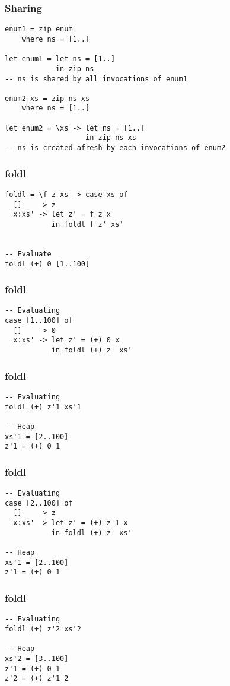 \documentclass{beamer}
\begin{document}
\begin{frame}[t,fragile]
\frametitle{Sharing}
\begin{verbatim}
enum1 = zip enum
    where ns = [1..]

let enum1 = let ns = [1..]
            in zip ns
-- ns is shared by all invocations of enum1

enum2 xs = zip ns xs
    where ns = [1..]

let enum2 = \xs -> let ns = [1..]
                   in zip ns xs
-- ns is created afresh by each invocations of enum2
\end{verbatim}
\end{frame}

\begin{frame}[fragile]
\frametitle{foldl}
\begin{verbatim}
foldl = \f z xs -> case xs of
  []    -> z
  x:xs' -> let z' = f z x
           in foldl f z' xs'


-- Evaluate
foldl (+) 0 [1..100]           
\end{verbatim}
\end{frame}

\begin{frame}[t,fragile]
\frametitle{foldl}
\begin{verbatim}
-- Evaluating
case [1..100] of
  []    -> 0
  x:xs' -> let z' = (+) 0 x
           in foldl (+) z' xs'
\end{verbatim}
\end{frame}

\begin{frame}[t,fragile]
\frametitle{foldl}
\begin{verbatim}
-- Evaluating
foldl (+) z'1 xs'1

-- Heap
xs'1 = [2..100]
z'1 = (+) 0 1
\end{verbatim}
\end{frame}

\begin{frame}[t,fragile]
\frametitle{foldl}
\begin{verbatim}
-- Evaluating
case [2..100] of
  []    -> z
  x:xs' -> let z' = (+) z'1 x
           in foldl (+) z' xs'

-- Heap
xs'1 = [2..100]
z'1 = (+) 0 1
\end{verbatim}
\end{frame}

\begin{frame}[t,fragile]
\frametitle{foldl}
\begin{verbatim}
-- Evaluating
foldl (+) z'2 xs'2

-- Heap
xs'2 = [3..100]
z'1 = (+) 0 1
z'2 = (+) z'1 2
\end{verbatim}
\end{frame}
\end{document}
